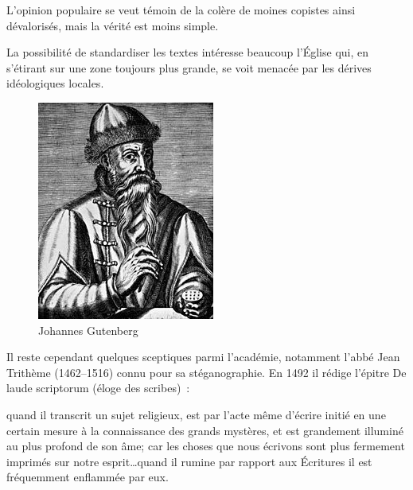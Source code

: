 \begin{minipage}[H]{0.39\linewidth}
L'opinion populaire se veut témoin de la colère de moines copistes ainsi dévalorisés, mais la vérité est moins simple. 

La possibilité de standardiser les textes intéresse beaucoup l'Église qui, en s'étirant sur une zone toujours plus grande, se voit menacée par les dérives idéologiques locales\cite{van1989call}.
\vspace{1cm}
\end{minipage}
\begin{minipage}[H]{0.59\linewidth}
  \begin{figure}[H]
  \centering
  \includegraphics[height=0.15\paperheight]{../resources/illustrations/gutenberg}
  \caption{Johannes Gutenberg}
  \end{figure}
\end{minipage}

Il reste cependant quelques sceptiques parmi l'académie, notamment l'abbé Jean Trithème (1462--1516) connu pour sa stéganographie. En 1492 il rédige l'épitre \og De laude scriptorum \fg{} (éloge des scribes)~:

\begin{coolquote} quand il transcrit un sujet religieux, est par l'acte même d'écrire initié en une certain mesure à la connaissance des grands mystères, et est grandement illuminé au plus profond de son âme; car les choses que nous écrivons sont plus fermement imprimés sur notre esprit\ldots quand il rumine par rapport aux Écritures il est fréquemment enflammée par eux.
\end{coolquote}

